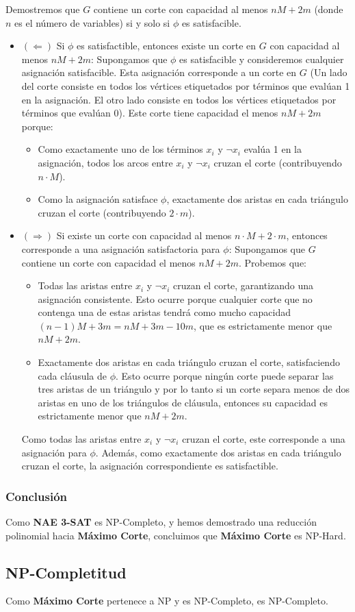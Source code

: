 \documentclass[a4paper,12pt]{article}
\begin{document}
Demostremos que $G$ contiene un corte con capacidad al menos $nM+2m$ (donde $n$ es el número de variables) si y solo si $\phi$ es satisfacible.
\begin{itemize}
    \item $(\Leftarrow)$ Si $\phi$ es satisfactible, entonces existe un corte en $G$ con capacidad al menos $nM + 2m$:
    Supongamos que $\phi$ es satisfacible y consideremos cualquier asignación satisfacible. Esta asignación corresponde a un corte en $G$ (Un lado del corte consiste en todos los vértices etiquetados por términos que evalúan 1 en la asignación. El otro lado consiste en todos los vértices etiquetados por términos que evalúan 0). 
    Este corte tiene capacidad el menos $nM+2m$ porque:
    \begin{itemize}
        \item Como exactamente uno de los términos $x_i$ y $\neg{x_i}$ evalúa 1 en la asignación, todos los arcos entre $x_i$ y $\neg x_i$ cruzan el corte (contribuyendo $n \cdot M$).
        \item Como la asignación satisface $\phi$, exactamente dos aristas en cada tri\'angulo cruzan el corte (contribuyendo $2 \cdot m$).
    \end{itemize}
    \item $(\Rightarrow)$ Si existe un corte con capacidad al menos $n \cdot M + 2 \cdot m$, entonces corresponde a una asignaci\'on satisfactoria para $\phi$:
    Supongamos que $G$ contiene un corte con capacidad el menos $nM+2m$. Probemos que:
    \begin{itemize}
        \item Todas las aristas entre $x_i$ y $\neg x_i$ cruzan el corte, garantizando una asignaci\'on consistente. Esto ocurre
        porque cualquier corte que no contenga una de estas aristas tendrá como mucho capacidad $(n-1)M+3m=nM+3m-10m$, que es estrictamente menor que $nM+2m$.
        \item Exactamente dos aristas en cada tri\'angulo cruzan el corte, satisfaciendo cada cl\'ausula de $\phi$. Esto ocurre porque ningún corte puede separar las tres aristas de un triángulo y
        por lo tanto si un corte separa menos de dos aristas en uno de los triángulos de cláusula, entonces su capacidad es estrictamente menor que $nM+2m$. 

    \end{itemize}
Como todas las aristas entre $x_i$ y $\neg x_i$ cruzan el corte, este corresponde a una asignación para $\phi$. 
Además, como exactamente dos aristas en cada tri\'angulo cruzan el corte, la asignaci\'on correspondiente es satisfactible.
\end{itemize}

\subsubsection{Conclusi\'on}
Como \textbf{NAE 3-SAT} es NP-Completo, y hemos demostrado una reducci\'on polinomial hacia \textbf{Máximo Corte}, concluimos que \textbf{Máximo Corte} es NP-Hard. 

\subsection{NP-Completitud}

Como \textbf{Máximo Corte} pertenece a NP y es NP-Completo, es NP-Completo.
\end{document}
